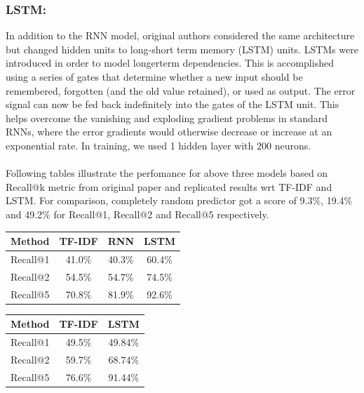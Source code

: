 \documentclass[letterpaper] {article} %
\begin{document}
\subsubsection{LSTM:} 
In addition to the RNN model, original authors considered the same architecture but changed hidden units to long-short term memory (LSTM) units\cite{hochreiter1997long}. LSTMs were introduced in order to model longerterm dependencies. This is accomplished using a series of gates that determine whether a new input should be remembered, forgotten (and the old value retained), or used as output. The error signal can now be fed back indefinitely into the gates of the LSTM unit. This helps overcome the vanishing and exploding gradient problems in standard RNNs, where the error gradients would otherwise decrease or increase at an exponential rate. In training, we used 1 hidden layer with 200 neurons. 
\\\\
Following tables illustrate the perfomance for above three models based on Recall@k metric from original paper and replicated results wrt TF-IDF and LSTM. For comparison, completely random predictor got a score of 9.3\%, 19.4\% and 49.2\% for Recall@1, Recall@2 and Recall@5 respectively.
\begin{center}
	\begin{tabular}{ |c|c|c|c| } 
		\hline
		\textbf{Method} & \textbf{TF-IDF} & \textbf{RNN} & \textbf{LSTM} \\ \hline
		Recall@1 & 41.0\%  & 40.3\% & 60.4\% \\ \hline
		Recall@2 & 54.5\% & 54.7\% & 74.5\% \\ \hline
		Recall@5 & 70.8\% & 81.9\% & 92.6\% \\ \hline
	\end{tabular}
\end{center}
\begin{center}
	\begin{tabular}{ |c|c|c| } 
		\hline
		\textbf{Method} & \textbf{TF-IDF} & \textbf{LSTM} \\ \hline
		Recall@1 & 49.5\% & 49.84\% \\ \hline
		Recall@2 & 59.7\% & 68.74\% \\ \hline
		Recall@5 & 76.6\% & 91.44\% \\ \hline
	\end{tabular}
\end{center}
\end{document}
